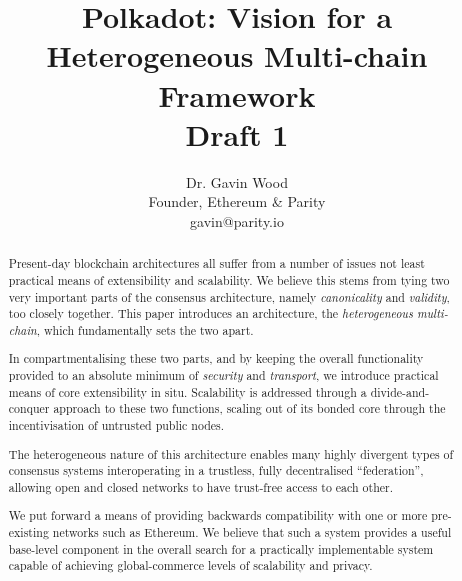 \documentclass[9pt,oneside]{amsart}
\title{Polkadot: Vision for a Heterogeneous Multi-chain Framework \\ {\smaller \textbf{Draft 1}}}
\author{
  Dr. Gavin Wood\\
  Founder, Ethereum \& Parity\\
   gavin@parity.io }
\begin{document}
\begin{abstract}
Present-day blockchain architectures all suffer from a number of issues not least practical means of extensibility and scalability. We believe this stems from tying two very important parts of the consensus architecture, namely \textit{canonicality} and \textit{validity}, too closely together. This paper introduces an architecture, the \textit{heterogeneous multi-chain}, which fundamentally sets the two apart.

In compartmentalising these two parts, and by keeping the overall functionality provided to an absolute minimum of \textit{security} and \textit{transport}, we introduce practical means of core extensibility in situ. Scalability is addressed through a divide-and-conquer approach to these two functions, scaling out of its bonded core through the incentivisation of untrusted public nodes.

 The heterogeneous nature of this architecture enables many highly divergent types of consensus systems interoperating in a trustless, fully decentralised ``federation'', allowing open and closed networks to have trust-free access to each other.

We put forward a means of providing backwards compatibility with one or more pre-existing networks such as Ethereum. We believe that such a system provides a useful base-level component in the overall search for a practically implementable system capable of achieving global-commerce levels of scalability and privacy.
\end{abstract}

\maketitle
\end{document}
